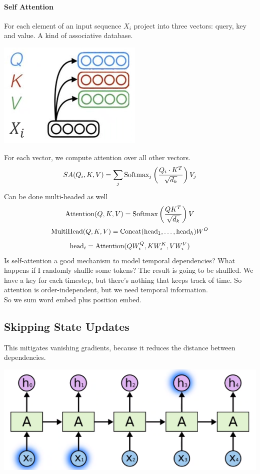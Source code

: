 \documentclass[10pt]{report}
\begin{document}
\paragraph{Self Attention} For each element of an input sequence $X_i$ project into three vectors: query, key and value. A kind of associative database.
\begin{center}
	\includegraphics[scale=0.5]{119.png}
\end{center}
For each vector, we compute attention over all other vectors.
$$SA(Q_i, K, V) = \sum_j\hbox{Softmax}_j\left(\frac{Q_i\cdot K^T}{\sqrt{d_k}}\right)V_j$$
Can be done multi-headed as well
$$\hbox{Attention}(Q,K,V)=\hbox{Softmax}\left(\frac{QK^T}{\sqrt{d_k}}\right)V$$
$$\hbox{MultiHead}(Q,K,V) = \hbox{Concat}(\hbox{head}_1,\ldots,\hbox{head}_h)W^O$$
$$\hbox{head}_i = \hbox{Attention}(QW_i^Q, KW_i^K, VW_i^V)$$
Is self-attention a good mechanism to model temporal dependencies? What happens if I randomly shuffle some tokens? The result is going to be shuffled. We have a key for each timestep, but there's nothing that keeps track of time. So attention is order-independent, but we need temporal information.\\
So we sum word embed plus position embed.
\subsection{Skipping State Updates}
This mitigates vanishing gradients, because it reduces the distance between dependencies.
\begin{center}
	\includegraphics[scale=0.5]{120.png}
\end{center}
\end{document}
